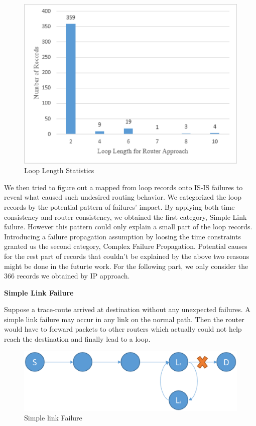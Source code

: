 \documentclass[conference, twocolumn, oneside, 10pt]{IEEEtran}
\begin{document}
\begin{figure}[h!]
\centering
\includegraphics[scale=0.4]{plot/loop_length2.eps}
\caption{Loop Length Statistics}
\label{fig:asdf2}
\end{figure}

We then tried to figure out a mapped from loop records onto IS-IS failures to reveal what caused such undesired routing behavior. We categorized the loop records by the potential pattern of failures' impact. By applying both time consistency and router consistency, we obtained the first category, Simple Link failure. However this pattern could only explain a small part of the loop records. Introducing a failure propagation assumption by loosing the time constraints granted us the second category, Complex Failure Propagation. Potential causes for the rest part of records that couldn't be explained by the above two reasons might be done in the futurte work. For the following part, we only consider the 366 records we obtained by IP approach.

\textbf{Simple Link Failure}

Suppose a trace-route arrived at destination without any unexpected failures. A simple link failure may occur in any link on the normal path. Then the router would have to forward packets to other routers which actually could not help reach the destination and finally lead to a loop.

\begin{figure}[h!]
\centering
\includegraphics[scale=0.4]{plot/simple_link_failure.eps}
\caption{Simple link Failure}
\label{fig:asdf3}
\end{figure}
\end{document}
